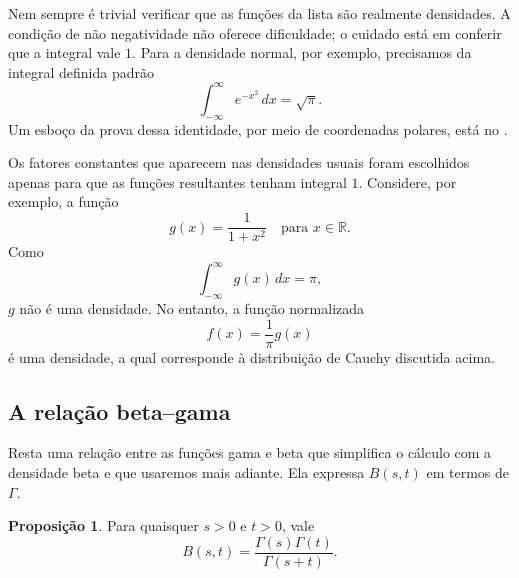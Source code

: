 \documentclass[12pt,portuguese]{article}
\theoremstyle{definition}
\newtheorem{proposition}[proposition]{Proposição}
\theoremstyle{plainexercise}
\theoremstyle{starredexercise}
\theoremstyle{definition}
\begin{document}
\medskip

Nem sempre é trivial verificar que as funções da lista são realmente densidades. A condição de não negatividade não oferece dificuldade; o cuidado está em conferir que a integral vale $1$. Para a densidade normal, por exemplo, precisamos da integral definida padrão
\[
  \int_{-\infty}^{\infty} e^{-x^2}\,dx = \sqrt{\pi}.
\]
Um esboço da prova dessa identidade, por meio de coordenadas polares, está no .

Os fatores constantes que aparecem nas densidades usuais foram escolhidos apenas para que as funções resultantes tenham integral $1$. Considere, por exemplo, a função
\[
  g(x) = \frac{1}{1 + x^2} \quad \text{para } x \in \mathbb{R}.
\]
Como
\[
  \int_{-\infty}^{\infty} g(x)\,dx = \pi,
\]
$g$ não é uma densidade. No entanto, a função normalizada
\[
  f(x) = \frac{1}{\pi} g(x)
\]
é uma densidade, a qual corresponde à distribuição de Cauchy discutida acima.


\medskip

\subsection{A relação beta--gama}

Resta uma relação entre as funções gama e beta que simplifica o cálculo com
a densidade beta e que usaremos mais adiante. Ela expressa $B(s,t)$ em
termos de $\Gamma$.

\begin{proposition}
  \label{prop:beta-gama}
  Para quaisquer $s>0$ e $t>0$, vale
  \[
    B(s,t) = \frac{\Gamma(s)\Gamma(t)}{\Gamma(s+t)}.
  \]
\end{proposition}
\end{document}
